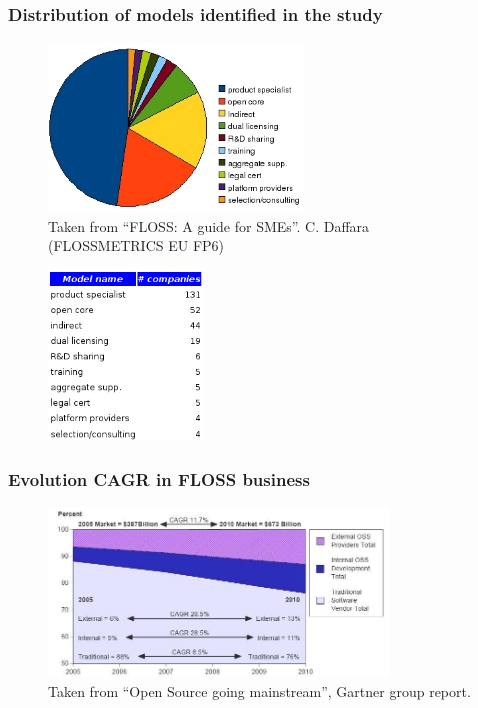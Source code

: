 \begin{frame}
\frametitle{Distribution of models identified in the study}
\begin{center}
\begin{figure}
 \includegraphics[height=4.5cm]{figs/models-share.jpg}
 \caption{\small Taken from ``FLOSS: A guide for SMEs''. C. Daffara (FLOSSMETRICS EU FP6)}
\end{figure}
\begin{figure}
 \includegraphics[height=4.5cm]{figs/models-share-numbers.png}
\end{figure}
\end{center}
\end{frame}

\begin{frame}
\frametitle{Evolution CAGR in FLOSS business}
\begin{center}
\begin{figure}
 \includegraphics[height=4.5cm]{figs/Economic-Gartner.jpg}
 \caption{\small Taken from ``Open Source going mainstream'', Gartner group report.}
\end{figure}
\end{center}
\end{frame}

